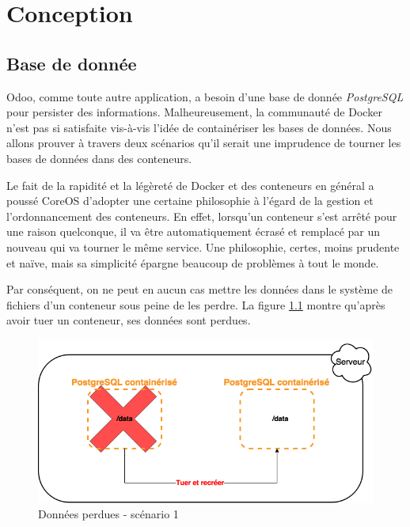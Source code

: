 \chapter{Conception}
\begin{onehalfspace}

\newpage

\section{Base de donnée}



Odoo, comme toute autre application, a besoin d'une base de donnée \emph{PostgreSQL} pour persister des informations. Malheureusement, la communauté de Docker n'est pas si satisfaite vis-à-vis l'idée de containériser les bases de données. Nous allons prouver à travers deux scénarios qu'il serait une imprudence de tourner les bases de données dans des conteneurs.

Le fait de la rapidité et la légèreté de Docker et des conteneurs en général a poussé CoreOS d'adopter une certaine philosophie à l'égard de la gestion et l'ordonnancement des conteneurs. En effet, lorsqu'un conteneur s'est arrêté pour une raison quelconque, il va être automatiquement écrasé et remplacé par un nouveau qui va tourner le même service. Une philosophie, certes, moins prudente et naïve, mais sa simplicité épargne beaucoup de problèmes à tout le monde.

Par conséquent, on ne peut en aucun cas mettre les données dans le système de fichiers d'un conteneur sous peine de les perdre. La figure \ref{fig:database1} montre qu'après avoir tuer un conteneur, ses données sont perdues.

\begin{figure}[H]
\centering
\includegraphics [scale=0.5]{chapitre4/assets/database1}
\caption{Données perdues - scénario 1}
\label{fig:database1}
\end{figure}


\end{onehalfspace}
